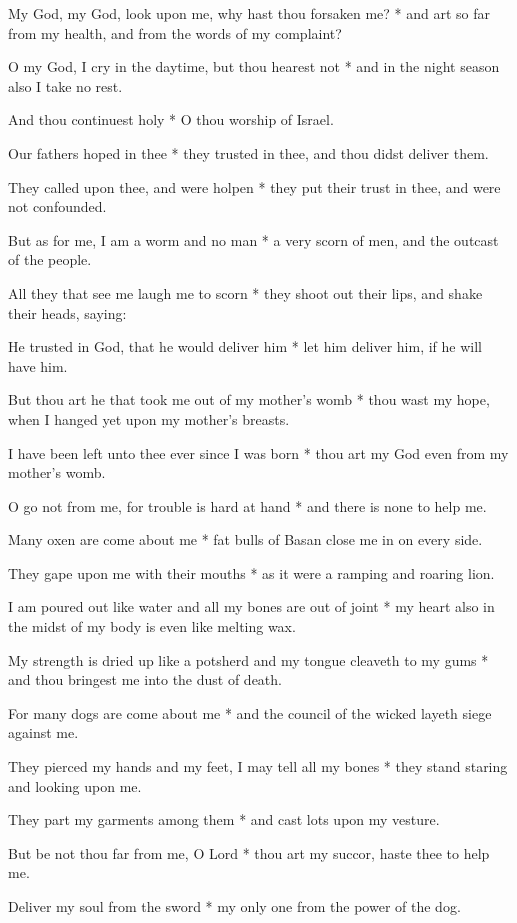 My God, my God, look upon me, why hast thou forsaken me? * and art so far from my health, and from the words of my complaint?

O my God, I cry in the daytime, but thou hearest not * and in the night season also I take no rest.

And thou continuest holy * O thou worship of Israel.

Our fathers hoped in thee * they trusted in thee, and thou didst deliver them.

They called upon thee, and were holpen * they put their trust in thee, and were not confounded.

But as for me, I am a worm and no man * a very scorn of men, and the outcast of the people.

All they that see me laugh me to scorn * they shoot out their lips, and shake their heads, saying:

He trusted in God, that he would deliver him * let him deliver him, if he will have him.

But thou art he that took me out of my mother's womb * thou wast my hope, when I hanged yet upon my mother's breasts.

I have been left unto thee ever since I was born * thou art my God even from my mother's womb.

O go not from me, for trouble is hard at hand * and there is none to help me.

Many oxen are come about me * fat bulls of Basan close me in on every side.

They gape upon me with their mouths * as it were a ramping and roaring lion.

I am poured out like water and all my bones are out of joint * my heart also in the midst of my body is even like melting wax.

My strength is dried up like a potsherd and my tongue cleaveth to my gums * and thou bringest me into the dust of death.

For many dogs are come about me * and the council of the wicked layeth siege against me.

They pierced my hands and my feet, I may tell all my bones * they stand staring and looking upon me.

They part my garments among them * and cast lots upon my vesture.

But be not thou far from me, O Lord * thou art my succor, haste thee to help me.

Deliver my soul from the sword * my only one from the power of the dog.

